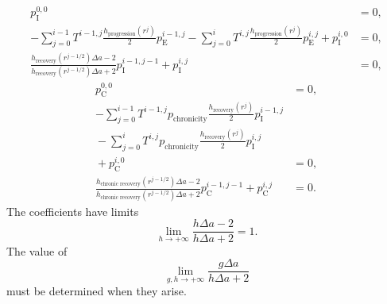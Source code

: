 \documentclass[12pt]{article}
\begin{document}
\begin{equation}
  \begin{split}
    p_{\mathrm{I}}^{0, 0} &= 0,
    \\
    - \sum_{j = 0}^{i - 1}
    T^{i - 1, j} \frac{h_{\text{progression}}(r^j)}{2} p_{\mathrm{E}}^{i - 1, j}
    - \sum_{j = 0}^i
    T^{i, j} \frac{h_{\text{progression}}(r^j)}{2} p_{\mathrm{E}}^{i, j}
    + p_{\mathrm{I}}^{i, 0}
    &= 0,
    \\
    \frac{h_{\text{recovery}}(r^{j - 1 / 2}) \Delta a - 2}
    {h_{\text{recovery}}(r^{j - 1 / 2}) \Delta a + 2}
    p_{\mathrm{I}}^{i - 1, j - 1}
    + p_{\mathrm{I}}^{i, j}
    &= 0,
  \end{split}
\end{equation}
\begin{equation}
  \begin{split}
    p_{\mathrm{C}}^{0, 0} &= 0,
    \\
    - \sum_{j = 0}^{i - 1}
    T^{i - 1, j} p_{\text{chronicity}} \frac{h_{\text{recovery}}(r^j)}{2}
    p_{\mathrm{I}}^{i - 1, j}
    \\ {}
    - \sum_{j = 0}^i
    T^{i, j} p_{\text{chronicity}} \frac{h_{\text{recovery}}(r^j)}{2}
    p_{\mathrm{I}}^{i, j}
    \\ {}
    + p_{\mathrm{C}}^{i, 0}
    &= 0,
    \\
    \frac{h_{\text{chronic recovery}}(r^{j - 1 / 2}) \Delta a - 2}
    {h_{\text{chronic recovery}}(r^{j - 1 / 2}) \Delta a + 2}
    p_{\mathrm{C}}^{i - 1, j - 1}
    + p_{\mathrm{C}}^{i, j}
    &= 0.
  \end{split}
\end{equation}
The coefficients have limits
\begin{equation}
  \lim_{h \to +\infty} \frac{h \Delta a - 2} {h \Delta a + 2} = 1.
\end{equation}
The value of
\begin{equation}
  \lim_{g, h \to +\infty} \frac{g \Delta a} {h \Delta a + 2}
\end{equation}
must be determined when they arise.



\end{document}
